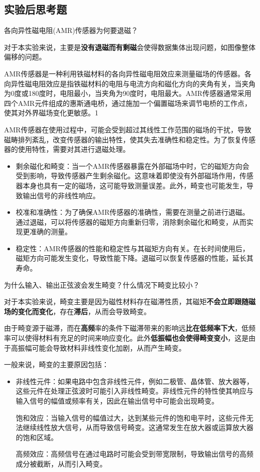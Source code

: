 \documentclass[dvipsnames, svgnames,a4paper,11pt]{article}
\begin{document}
	\clearpage
	\subsection{实验后思考题}
	\begin{question}
		各向异性磁电阻(AMR)传感器为何要退磁？
	\end{question}
	对于本实验来说，主要是\textbf{没有退磁而有剩磁}会使得数据集体出现问题，如图像整体偏移的问题。
	
	AMR传感器是一种利用铁磁材料的各向异性磁电阻效应来测量磁场的传感器。各向异性磁电阻效应是指铁磁材料的电阻与电流方向和磁化方向的夹角有关，当夹角为0度或180度时，电阻最小，当夹角为90度时，电阻最大。AMR传感器通常采用四个AMR元件组成的惠斯通电桥，通过施加一个偏置磁场来调节电桥的工作点，使其对外界磁场变化更敏感。1
	
	AMR传感器在使用过程中，可能会受到超过其线性工作范围的磁场的干扰，导致磁畴排列紊乱，改变传感器的输出特性，使其失去准确性和稳定性。为了恢复传感器的使用特性，需要对其进行退磁处理。
	\begin{itemize}
		\item 剩余磁化和畸变：当一个AMR传感器暴露在外部磁场中时，它的磁矩方向会受到影响，导致传感器产生剩余磁化。这意味着即使没有外部磁场作用，传感器本身也具有一定的磁场，这可能导致测量误差。此外，畸变也可能发生，导致输出信号的非线性响应。
		
		\item 校准和准确性：为了确保AMR传感器的准确性，需要在测量之前进行退磁。通过退磁，可以将传感器的磁矩方向重新归零，消除剩余磁化和畸变，从而实现更准确的测量。
		
		\item 稳定性：AMR传感器的性能和稳定性与其磁矩方向有关。在长时间使用后，磁矩方向可能发生变化，导致性能下降。退磁可以恢复传感器的性能，延长其寿命。
	\end{itemize}
	
	\begin{question}
		为什么输入、输出正弦波会发生畸变？什么情况下畸变比较小？
	\end{question}
	对于本实验来说，畸变主要是因为磁性材料存在磁滞性质，其磁矩\textbf{不会立即跟随磁场的变化而变化}，存在\textbf{滞后}，从而会导致畸变。
	
	由于畸变源于磁滞，而在\textbf{高频}率的条件下磁滞带来的影响远\textbf{比在低频率下大}，低频率可以使得材料有充足的时间来响应变化。此外\textbf{低振幅也会使得畸变变小}，这是由于高振幅可能会导致材料非线性变化加剧，从而产生畸变。
	
	一般来说，畸变的主要原因包括：
	\begin{itemize}
		\item 非线性元件：如果电路中包含非线性元件，例如二极管、晶体管、放大器等，这些元件在处理正弦波时可能引入非线性畸变。非线性元件的特性使其响应与输入信号的幅值或频率有关，因此在输出信号中可能会出现畸变。
		
		饱和效应：当输入信号的幅值过大，达到某些元件的饱和电平时，这些元件无法继续线性放大信号，从而导致信号畸变。这通常发生在放大器或运算放大器的饱和区域。
		
		高频效应：高频信号在通过电路时可能会受到带宽限制，导致输出信号的高频成分被截断，从而引入畸变。
	\end{itemize}
	
\end{document}
